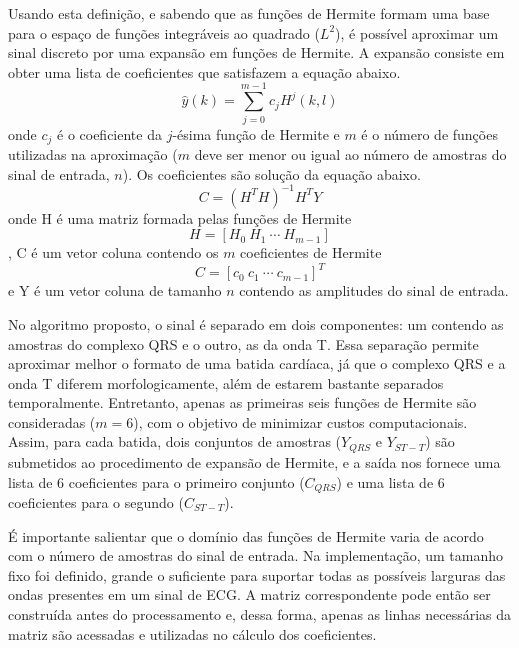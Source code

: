 Usando esta definição, e sabendo que as funções de Hermite formam uma base para o espaço de funções integráveis ao quadrado ($L^2$), é possível aproximar um sinal discreto por uma expansão em funções de Hermite. A expansão consiste em obter uma lista de coeficientes que satisfazem a equação abaixo.
\begin{equation} \label{equ:hermite_expansion}
   \hat{y}(k) = \sum_{j=0}^{m-1} c_jH^j(k,l)
\end{equation}
onde $c_j$ é o coeficiente da $j$-ésima função de Hermite e $m$ é o número de funções utilizadas na aproximação ($m$ deve ser menor ou igual ao número de amostras do sinal de entrada, $n$). Os coeficientes são solução da equação abaixo.
\begin{equation} \label{equ:solve}
    C = (H^TH)^{-1}H^TY
\end{equation}
onde H é uma matriz formada pelas funções de Hermite
\begin{equation}
    H = [H_0\ H_1\ \cdots\ H_{m-1}]
\end{equation},
C é um vetor coluna contendo os $m$ coeficientes de Hermite
\begin{equation}
    C = [c_0\ c_1\ \cdots\ c_{m-1}]^T
\end{equation}
e Y é um vetor coluna de tamanho $n$ contendo as amplitudes do sinal de entrada.

No algoritmo proposto, o sinal é separado em dois componentes: um contendo as amostras do complexo QRS e o outro, as da onda T. Essa separação permite aproximar melhor o formato de uma batida cardíaca, já que o complexo QRS e a onda T diferem morfologicamente, além de estarem bastante separados temporalmente. Entretanto, apenas as primeiras seis funções de Hermite são consideradas ($m = 6$), com o objetivo de minimizar custos computacionais. Assim, para cada batida, dois conjuntos de amostras ($Y_{QRS}$ e $Y_{ST-T}$) são submetidos ao procedimento de expansão de Hermite, e a saída nos fornece uma lista de 6 coeficientes para o primeiro conjunto ($C_{QRS}$) e uma lista de 6 coeficientes para o segundo ($C_{ST-T}$).

É importante salientar que o domínio das funções de Hermite varia de acordo com o número de amostras do sinal de entrada. Na implementação, um tamanho fixo foi definido, grande o suficiente para suportar todas as possíveis larguras das ondas presentes em um sinal de ECG. A matriz correspondente pode então ser construída antes do processamento e, dessa forma, apenas as linhas necessárias da matriz são acessadas e utilizadas no cálculo dos coeficientes.
